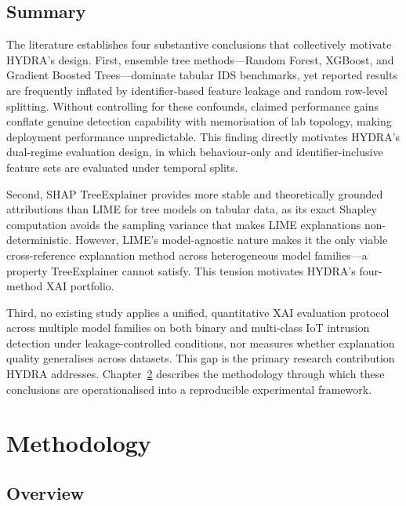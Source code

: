 \documentclass[12pt,a4paper]{report}
\begin{document}
\section{Summary}
\label{sec:lit-summary}

The literature establishes four substantive conclusions that collectively motivate HYDRA's design. First, ensemble tree methods---Random Forest, XGBoost, and Gradient Boosted Trees---dominate tabular IDS benchmarks, yet reported results are frequently inflated by identifier-based feature leakage and random row-level splitting. Without controlling for these confounds, claimed performance gains conflate genuine detection capability with memorisation of lab topology, making deployment performance unpredictable. This finding directly motivates HYDRA's dual-regime evaluation design, in which behaviour-only and identifier-inclusive feature sets are evaluated under temporal splits.

Second, SHAP TreeExplainer provides more stable and theoretically grounded attributions than LIME for tree models on tabular data, as its exact Shapley computation avoids the sampling variance that makes LIME explanations non-deterministic. However, LIME's model-agnostic nature makes it the only viable cross-reference explanation method across heterogeneous model families---a property TreeExplainer cannot satisfy. This tension motivates HYDRA's four-method XAI portfolio.

Third, no existing study applies a unified, quantitative XAI evaluation protocol across multiple model families on both binary and multi-class IoT intrusion detection under leakage-controlled conditions, nor measures whether explanation quality generalises across datasets. This gap is the primary research contribution HYDRA addresses. Chapter~\ref{ch:methodology} describes the methodology through which these conclusions are operationalised into a reproducible experimental framework.

\chapter{Methodology}
\label{ch:methodology}

\section{Overview}
\label{sec:meth-overview}
\end{document}
